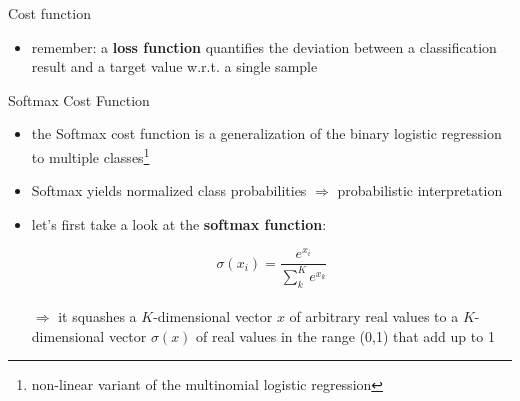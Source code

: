 \documentclass{beamer}
\begin{document}
\begin{frame}{Cost function}
\begin{itemize}
\item remember: a \textbf{loss function} quantifies the deviation between a classification result and a target value w.r.t. a single sample
\end{itemize}
\end{frame}

\begin{frame}{Softmax Cost Function}
\begin{itemize}
\item the Softmax cost function is a generalization of the binary logistic regression to multiple classes\footnote{non-linear variant of the multinomial logistic regression}
\item Softmax yields normalized class probabilities $\Rightarrow$ probabilistic interpretation
\item let's first take a look at the \textbf{softmax function}: 

\begin{equation}
    \sigma(x_i) = \frac{e^{x_i}}{\sum_{k}^K e^{x_k}}
\end{equation}\\
$\Rightarrow$ it squashes a $K$-dimensional vector $x$ of arbitrary real values to a $K$-dimensional vector $\sigma(x)$ of real values in the range (0,1) that add up to 1
\end{itemize}
\end{frame}
\end{document}
